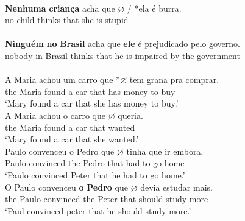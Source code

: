 \documentclass[output=paper]{langsci/langscibook}
\begin{document}
\ea\label{ex:26.22}
    \ea \textcite{NegraoMuller1996}\\
    \gll    \textbf{Nenhuma} \textbf{criança} acha que \textbf{$\varnothing$} / *ela é burra.\\
            no child     thinks that {} {} \hphantom{(}she is stupid\\
    \ex \textcite{BarbosaDuarteKato2005}\\
    \gll    \textbf{Ninguém} \textbf{no} \textbf{Brasil} acha    que \textbf{ele}\textbf{} é prejudicado pelo governo.\\
            nobody    in Brazil   thinks  that he is  impaired     by-the government\\
    \z
\ex%
    \label{ex:26.23}
    \ea     \textcite{FigueiredoSilva2000}\\
	\gll	A Maria achou um carro que *\textbf{$\varnothing$} tem grana pra comprar. \\
			the Maria  found   a   car     that  {} has money  to buy\\
	\glt	\enquote*{Mary found  a car that she has money to buy.}
    \ex     \textcite{Kato2009}\\
	\gll	A Maria achou o carro que \textbf{$\varnothing$} queria.\\
			the Maria    found  a car     that {} wanted\\
	\glt	\enquote*{Mary found a car that she wanted.}
    \z
\ex%
    \label{ex:26.24}
    \ea     \textcite{Modesto2000}\\
	\gll	Paulo convenceu o Pedro que  \textbf{$\varnothing$} tinha que ir embora.\\
            Paulo  convinced the Pedro that {} had to go home\\
	\glt	\enquote*{Paulo convinced Peter that he had to go home.}
    \ex     \textcite{Kato2009}\\
    \gll	O Paulo convenceu \textbf{o} \textbf{Pedro}\textbf{} que \textbf{$\varnothing$}\textbf{} devia estudar mais.\\
			the Paulo convinced the Peter that {} should study more\\
	\glt	\enquote*{Paul convinced peter that he should study more.}
    \z
\z
\end{document}
